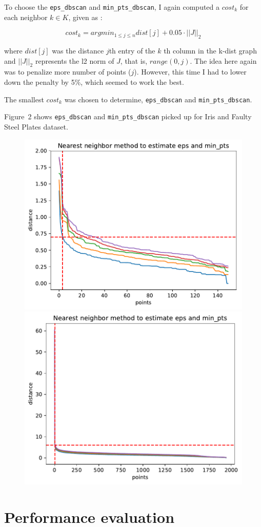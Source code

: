 \documentclass[12pt]{article}
\begin{document}
To choose the \texttt{eps\_dbscan} and \texttt{min\_pts\_dbscan}, I again computed a $cost_k$ for each neighbor $k \in K$, given as :

\begin{equation}
cost_k = argmin_{1 \leq j \leq n} dist[j] + 0.05 \cdot || J ||_2
\end{equation}

where $dist[j]$ was the distance $j$th entry of the $k$ th column in the k-dist graph and $|| J ||_2$ represents the l2 norm of $J$, that is, $range(0, j)$. The idea here again was to penalize more number of points ($j$). However, this time I had to lower down the penalty by 5\%, which seemed to work the best.

The smallest $cost_k$ was chosen to determine,  \texttt{eps\_dbscan} and \texttt{min\_pts\_dbscan}.

Figure~2 shows \texttt{eps\_dbscan} and \texttt{min\_pts\_dbscan} picked up for Iris and Faulty Steel Plates dataset.

\begin{figure}
\begin{minipage}{\linewidth}
\includegraphics[width=0.5\linewidth]{Iris_nn_determination_minpts_eps.pdf}
\includegraphics[width=0.5\linewidth]{Fault_Steel_Platesnn_determination_minpts_eps.pdf}
\end{minipage}
\end{figure} 

\section*{Performance evaluation}
\end{document}
